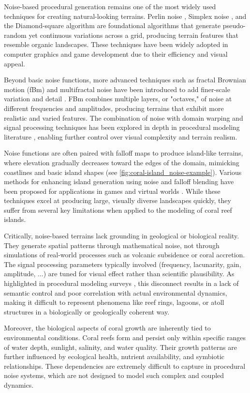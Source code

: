 Noise-based procedural generation remains one of the most widely used techniques for creating natural-looking terrains. Perlin noise \cite{Perlin1985}, Simplex noise \cite{Perlin2001}, and the Diamond-square algorithm \cite{Fournier1982} are foundational algorithms that generate pseudo-random yet continuous variations across a grid, producing terrain features that resemble organic landscapes. These techniques have been widely adopted in computer graphics and game development due to their efficiency and visual appeal.

Beyond basic noise functions, more advanced techniques such as fractal Brownian motion (fBm) and multifractal noise have been introduced to add finer-scale variation and detail \cite{Musgrave1989,Ebert2003}. FBm combines multiple layers, or "octaves," of noise at different frequencies and amplitudes, producing terrains that exhibit more realistic and varied features. The combination of noise with domain warping and signal processing techniques has been explored in depth in procedural modeling literature \cite{Reinhard2010}, enabling further control over visual complexity and terrain realism.

Noise functions are often paired with falloff maps to produce island-like terrains, where elevation gradually decreases toward the edges of the domain, mimicking coastlines and basic island shapes (see \cref{fig:coral-island_noise-example}). Various methods for enhancing island generation using noise and falloff blending have been proposed for applications in games and virtual worlds \cite{Olsen2004}. While these techniques excel at producing large, visually diverse landscapes quickly, they suffer from several key limitations when applied to the modeling of coral reef islands.

Critically, noise-based terrains lack grounding in geological or biological reality. They generate spatial patterns through mathematical noise, not through simulations of real-world processes such as volcanic subsidence or coral accretion. The signal processing parameters typically involved (frequency, lacunarity, gain, amplitude, ...) are tuned for visual effect rather than scientific plausibility. As highlighted in procedural modeling surveys \cite{Smelik2009,Galin2019}, this disconnect results in a lack of semantic control and poor correlation with actual environmental dynamics, making it difficult to represent phenomena like reef rings, lagoons, or atoll structures in a biologically or geologically coherent way.

Moreover, the biological aspects of coral growth are inherently tied to environmental conditions. Coral reefs form and persist only within specific ranges of water depth, sunlight, salinity, and water quality. Their growth patterns are further influenced by ecological health, nutrient availability, and symbiotic relationships. These dependencies are extremely difficult to capture in procedural noise systems, which are not designed to model such complex and coupled dynamics.

